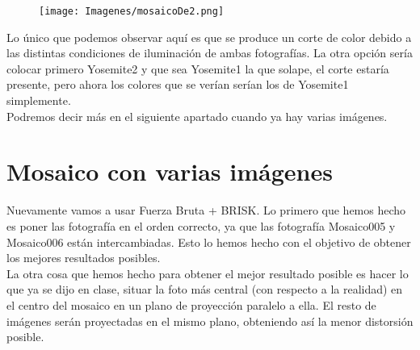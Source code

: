 \documentclass[10pt,a4paper]{article}
\begin{document}
\begin{figure}[H]
\centering
\texttt{[image: Imagenes/mosaicoDe2.png]}
\end{figure}

Lo único que podemos observar aquí es que se produce un corte de color debido a las distintas condiciones de iluminación de ambas fotografías. La otra opción sería colocar primero Yosemite2 y que sea Yosemite1 la que solape, el corte estaría presente, pero ahora los colores que se verían serían los de Yosemite1 simplemente.\\

Podremos decir más en el siguiente apartado cuando ya hay varias imágenes.\\

\newpage
\section{Mosaico con varias imágenes}

Nuevamente vamos a usar Fuerza Bruta + BRISK. Lo primero que hemos hecho es poner las fotografía en el orden correcto, ya que las fotografía Mosaico005 y Mosaico006 están intercambiadas. Esto lo hemos hecho con el objetivo de obtener los mejores resultados posibles.\\

La otra cosa que hemos hecho para obtener el mejor resultado posible es hacer lo que ya se dijo en clase, situar la foto más central (con respecto a la realidad) en el centro del mosaico en un plano de proyección paralelo a ella. El resto de imágenes serán proyectadas en el mismo plano, obteniendo así la menor distorsión posible.\\
\end{document}
